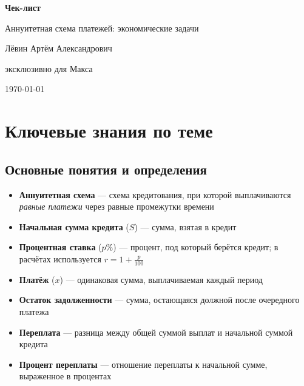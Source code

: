 \documentclass[a4paper,12pt]{article}
\begin{document}
\begin{titlepage}
    \centering
    \vspace*{2cm}

    {\Huge\bfseries\color{accent} Чек-лист}\par
    \vspace{0.5cm}
    {\Large\color{textgray} Аннуитетная схема платежей: экономические задачи}\par

    \vspace{3cm}

    {\large\color{textgray} Лёвин Артём Александрович}\par
    {\large\color{textgray} эксклюзивно для Макса}\par

    \vspace{2cm}

    {\large\color{textgray} \today}\par

    \vfill


\end{titlepage}

\newpage

\section*{Ключевые знания по теме}

\subsection*{Основные понятия и определения}
\begin{itemize}[label=\textcolor{accent}{\textbullet}, leftmargin=*]
    \item \textbf{Аннуитетная схема} — схема кредитования, при которой выплачиваются \textit{равные платежи} через равные промежутки времени
    \item \textbf{Начальная сумма кредита} ($S$) — сумма, взятая в кредит
    \item \textbf{Процентная ставка} ($p\%$) — процент, под который берётся кредит; в расчётах используется $r = 1 + \frac{p}{100}$
    \item \textbf{Платёж} ($x$) — одинаковая сумма, выплачиваемая каждый период
    \item \textbf{Остаток задолженности} — сумма, остающаяся должной после очередного платежа
    \item \textbf{Переплата} — разница между общей суммой выплат и начальной суммой кредита
    \item \textbf{Процент переплаты} — отношение переплаты к начальной сумме, выраженное в процентах
\end{itemize}
\end{document}
